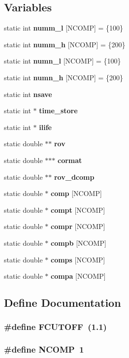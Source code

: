 \subsection*{Variables}
\begin{CompactItemize}
\item 
static int {\bf numm\_\-l} [NCOMP] = \{100\}
\item 
static int {\bf numm\_\-h} [NCOMP] = \{200\}
\item 
static int {\bf numn\_\-l} [NCOMP] = \{100\}
\item 
static int {\bf numn\_\-h} [NCOMP] = \{200\}
\item 
static int {\bf nsave}
\item 
static int $\ast$ {\bf time\_\-store}
\item 
static int $\ast$ {\bf ilife}
\item 
static double $\ast$$\ast$ {\bf rov}
\item 
static double $\ast$$\ast$$\ast$ {\bf cormat}
\item 
static double $\ast$$\ast$ {\bf rov\_\-dcomp}
\item 
static double $\ast$ {\bf comp} [NCOMP]
\item 
static double $\ast$ {\bf compt} [NCOMP]
\item 
static double $\ast$ {\bf compr} [NCOMP]
\item 
static double $\ast$ {\bf compb} [NCOMP]
\item 
static double $\ast$ {\bf comps} [NCOMP]
\item 
static double $\ast$ {\bf compa} [NCOMP]
\end{CompactItemize}


\subsection{Define Documentation}
\subsubsection{\setlength{\rightskip}{0pt plus 5cm}\#define FCUTOFF~(1.1)}\label{sub__proj_8c_8a4df856c98c17e7ada06831ed0a5e56}


\subsubsection{\setlength{\rightskip}{0pt plus 5cm}\#define NCOMP~1}\label{sub__proj_8c_22bc9d6f1ad600b96fdf86442683e993}


